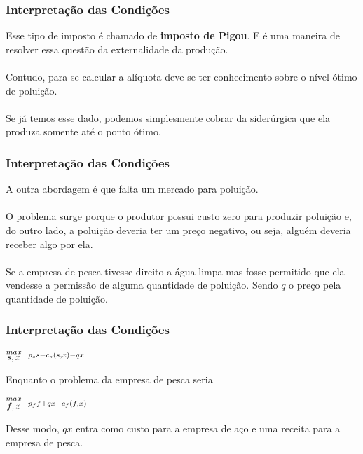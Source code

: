 \documentclass{beamer}[10]
\begin{document}
\begin{frame}
	\frametitle{Interpretação das Condições}

	Esse tipo de imposto é chamado de \textbf{imposto de Pigou}. E é uma maneira de resolver essa questão da externalidade da produção.
	\\~\\
	Contudo, para se calcular a alíquota deve-se ter conhecimento sobre o nível ótimo de poluição.
	\\~\\
	Se já temos esse dado, podemos simplesmente cobrar da siderúrgica que ela produza somente até o ponto ótimo.

\end{frame}

\begin{frame}
	\frametitle{Interpretação das Condições}

	A outra abordagem é que falta um mercado para poluição.
	\\~\\
	O problema surge porque o produtor possui custo zero para produzir poluição e, do outro lado, a poluição deveria ter um preço negativo, ou seja, alguém deveria receber algo por ela.
	\\~\\
	Se a empresa de pesca tivesse direito a água limpa mas fosse permitido que ela vendesse a permissão de alguma quantidade de poluição. Sendo $q$ o preço pela quantidade de poluição.

\end{frame}

\begin{frame}
	\frametitle{Interpretação das Condições}

	\begin{center}
		\LARGE $ \stackrel{max}{\text{\small $s,x$}} \ \ \stackrel{p_ss - c_s(s,x) - qx}{\ } $ %
	\end{center}
	
	Enquanto o problema da empresa de pesca seria
	
	\begin{center}
		\LARGE $ \stackrel{max}{\text{\small $f,x$}} \ \ %
		\stackrel{p_ff + qx - c_f(f,x)}{\ } $ %
	\end{center}

	Desse modo, $qx$ entra como custo para a empresa de aço e uma receita para a empresa de pesca.

\end{frame}
\end{document}
